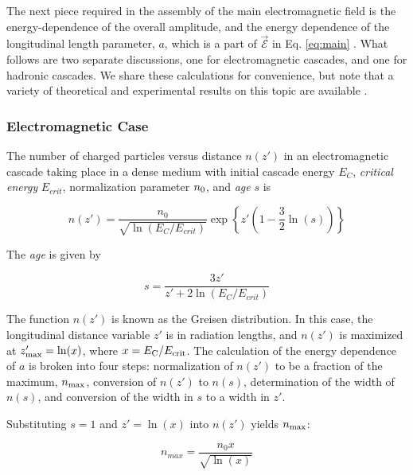 \documentclass[amsmath,amssymb,aps,prd,10pt,twocolumn]{revtex4}
\begin{document}
The next piece required in the assembly of the main electromagnetic field is the energy-dependence of the overall amplitude, and the energy dependence of the longitudinal length parameter, $a$, which is a part of $\vec{\mathcal{E}}$ in Eq. \ref{eq:main} \cite{10.1103/physrevd.65.016003}.  What follows are two separate discussions, one for electromagnetic cascades, and one for hadronic cascades.  We share these calculations for convenience, but note that a variety of theoretical and experimental results on this topic are available \cite{saltzberg} \cite{ANDRINGA2011360} \cite{10.1088/1742-6596/1879/3/032089}.  

\subsubsection{Electromagnetic Case}

The number of charged particles versus distance $n(z')$ in an electromagnetic cascade taking place in a dense medium with initial cascade energy $E_C$, \textit{critical energy} $E_{crit}$, normalization parameter $n_{\rm 0}$, and \textit{age} $s$ is \cite{10.1016/j.astropartphys.2017.03.008}

\begin{equation}
n(z') = \frac{n_0}{\sqrt{\ln(E_C/E_{crit})}} \exp \left \lbrace z'\left(1 - \frac{3}{2}\ln(s) \right) \right \rbrace
\end{equation}

The \textit{age} is given by

\begin{equation}
s = \frac{3z'}{z' + 2\ln(E_C/E_{crit})}
\end{equation}

The function $n(z')$ is known as the Greisen distribution.  In this case, the longitudinal distance variable $z'$ is in radiation lengths, and $n(z')$ is maximized at $z'_{\rm max} = \ln(x)$, where $x = E_{\rm C}/E_{\rm crit}$.  The calculation of the energy dependence of $a$ is broken into four steps: normalization of $n(z')$ to be a fraction of the maximum, $n_{\rm max}$, conversion of $n(z')$ to $n(s)$, determination of the width of $n(s)$, and conversion of the width in $s$ to a width in $z'$.

Substituting $s = 1$ and $z' = \ln(x)$ into $n(z')$ yields $n_{\rm max}$:

\begin{equation}
n_{max} = \frac{n_0 x}{\sqrt{\ln(x)}} 
\end{equation}
\end{document}
